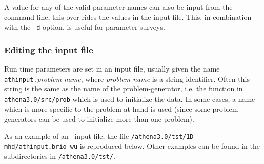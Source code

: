 A value for any of the valid parameter names can also be input from
the command line, this over-rides the values in the input file.
This, in combination with the {\tt -d} option, is
useful for parameter surveys.

\subsubsection{Editing the input file}

Run time parameters are set in an input file, usually given the name
{\tt athinput.}{\it problem-name}, where {\it problem-name} is a
string identifier.  Often this string is the same as the name of the
problem-generator, i.e. the function in {\tt athena3.0/src/prob} which
is used to initialize the data.  In some cases, a name which is more
specific to the problem at hand is used (since some problem-generators
can be used to initialize more than one problem).

As an example of an \ath\ input file, the file 
{\tt /athena3.0/tst/1D-mhd/athinput.brio-wu} is reproduced below.
Other examples can be found in the subdirectories in {\tt /athena3.0/tst/}.

